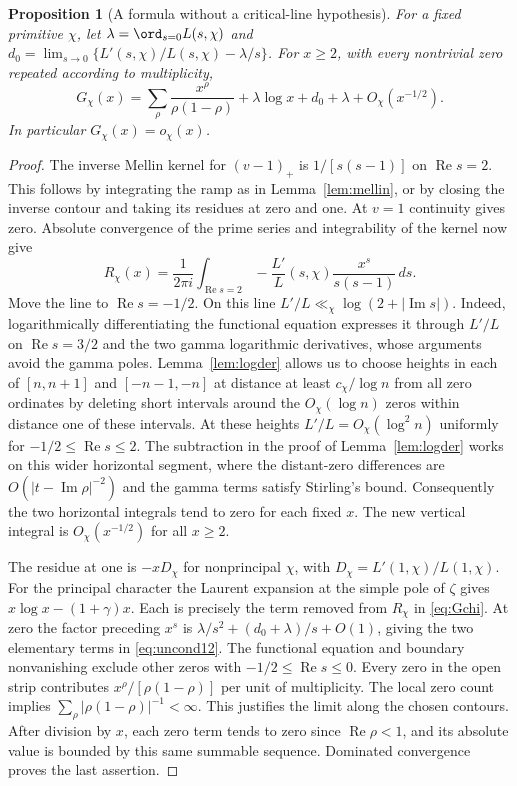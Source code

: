 \documentclass[a4paper,11pt]{article}
\newtheorem{proposition}{Proposition}[section]
\theoremstyle{definition}
\theoremstyle{remark}
\newcommand{\real}{\operatorname{Re}}\newcommand{\imag}{\operatorname{Im}}
\numberwithin{equation}{section}
\begin{document}
\begin{proposition}[A formula without a critical-line hypothesis]\label{prop:allzeros}
For a fixed primitive \(\chi\), let \(\lambda=\ord_{s=0} L(s,\chi)\) and \(d_0=\lim_{s\to0}\{L'(s,\chi)/L(s,\chi)-\lambda/s\}\). For \(x\ge2\), with every nontrivial zero repeated according to multiplicity,
\begin{equation}
 G_\chi(x)=\sum_\rho\frac{x^\rho}{\rho(1-\rho)}
             +\lambda\log x+d_0+\lambda+O_\chi(x^{-1/2}).
                                                               \label{eq:uncond12}
\end{equation}
In particular \(G_\chi(x)=o_\chi(x)\).
\end{proposition}
\begin{proof}
The inverse Mellin kernel for \((v-1)_+\) is \(1/[s(s-1)]\) on \(\real s=2\). This follows by integrating the ramp as in Lemma~\ref{lem:mellin}, or by closing the inverse contour and taking its residues at zero and one. At \(v=1\) continuity gives zero. Absolute convergence of the prime series and integrability of the kernel now give
\[
 R_\chi(x)=\frac{1}{2\pi i}\int_{\real s=2}
                  -\frac{L'}{L}(s,\chi)\frac{x^s}{s(s-1)}\,ds .
\]
Move the line to \(\real s=-1/2\). On this line \(L'/L\ll_\chi\log(2+|\imag s|)\). Indeed, logarithmically differentiating the functional equation expresses it through \(L'/L\) on \(\real s=3/2\) and the two gamma logarithmic derivatives, whose arguments avoid the gamma poles. Lemma~\ref{lem:logder} allows us to choose heights in each of \([n,n+1]\) and \([-n-1,-n]\) at distance at least \(c_\chi/\log n\) from all zero ordinates by deleting short intervals around the \(O_\chi(\log n)\) zeros within distance one of these intervals. At these heights \(L'/L=O_\chi(\log^2n)\) uniformly for \(-1/2\le\real s\le2\). The subtraction in the proof of Lemma~\ref{lem:logder} works on this wider horizontal segment, where the distant-zero differences are \(O(|t-\imag\rho|^{-2})\) and the gamma terms satisfy Stirling's bound. Consequently the two horizontal integrals tend to zero for each fixed \(x\). The new vertical integral is \(O_\chi(x^{-1/2})\) for all \(x\ge2\).

The residue at one is \(-xD_\chi\) for nonprincipal \(\chi\), with \(D_\chi=L'(1,\chi)/L(1,\chi)\). For the principal character the Laurent expansion at the simple pole of \(\zeta\) gives \(x\log x-(1+\gamma)x\). Each is precisely the term removed from \(R_\chi\) in \eqref{eq:Gchi}. At zero the factor preceding \(x^s\) is \(\lambda/s^2+(d_0+\lambda)/s+O(1)\), giving the two elementary terms in \eqref{eq:uncond12}. The functional equation and boundary nonvanishing exclude other zeros with \(-1/2\le\real s\le0\). Every zero in the open strip contributes \(x^\rho/[\rho(1-\rho)]\) per unit of multiplicity. The local zero count implies \(\sum_\rho|\rho(1-\rho)|^{-1}<\infty\). This justifies the limit along the chosen contours. After division by \(x\), each zero term tends to zero since \(\real\rho<1\), and its absolute value is bounded by this same summable sequence. Dominated convergence proves the last assertion.
\end{proof}
\end{document}
